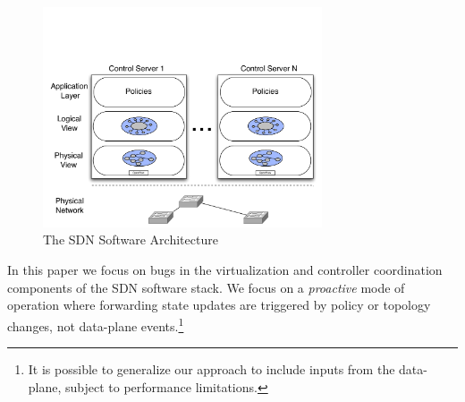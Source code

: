 
\begin{figure}[t]
    \includegraphics[width=3.25in]{../diagrams/architecture/SDN_Stack.pdf}
    \caption[]{\label{fig:basicarch} The SDN Software Architecture }
\end{figure}

In this paper we focus on bugs in the virtualization and controller coordination
components of the SDN software stack. We focus on a \emph{proactive} mode of
operation where forwarding state updates are triggered by policy or topology
changes, not data-plane events.\footnote{It is possible to generalize our
approach to include inputs from the data-plane, subject to performance limitations.}

